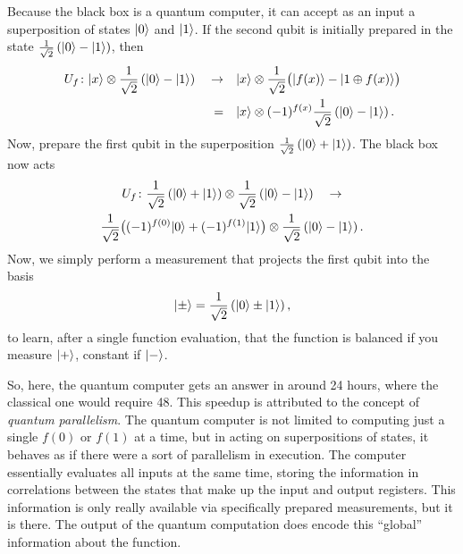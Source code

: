 Because the black box is a quantum computer, it can accept
as an input a superposition of states ${|{0}\rangle}$ and ${|{1}\rangle}$.
If the second qubit is initially prepared in the state
$\frac{1}{\sqrt{2}}\left( {|{0}\rangle} - {|{1}\rangle} \right)$, then
\begin{equation}
\begin{split}
U_f\colon {|{x}\rangle}\otimes\frac{1}{\sqrt{2}}\left( {|{0}\rangle} - {|{1}\rangle} \right)
\quad\to&\quad{|{x}\rangle}\otimes\frac{1}{\sqrt{2}}\bigl({|{f(x)}\rangle} - {|{1\oplus f(x)}\rangle}\bigr)\\
=&\quad{|{x}\rangle}\otimes(-1)^{f(x)}\frac{1}{\sqrt{2}}\left( {|{0}\rangle} - {|{1}\rangle} \right).
\end{split}
\end{equation}
Now, prepare the first qubit in the superposition 
$\frac{1}{\sqrt{2}}\left( {|{0}\rangle} + {|{1}\rangle} \right)$.
The black box now acts
\begin{multline}
U_f\colon \frac{1}{\sqrt{2}}\left( {|{0}\rangle} + {|{1}\rangle} \right)
        \otimes\frac{1}{\sqrt{2}}\left( {|{0}\rangle} - {|{1}\rangle} \right) \quad\to\\
        \frac{1}{\sqrt{2}}\bigl( (-1)^{f(0)}{|{0}\rangle} + (-1)^{f(1)}{|{1}\rangle} \bigr)
        \otimes\frac{1}{\sqrt{2}}\left( {|{0}\rangle} - {|{1}\rangle} \right).
\end{multline}
Now, we simply perform a measurement that projects the first qubit into
the basis
\begin{equation}
{|{\pm}\rangle} = \frac{1}{\sqrt{2}}\left( {|{0}\rangle} \pm {|{1}\rangle} \right),
\end{equation}
to learn, after a single function evaluation, that the function is
balanced if you measure ${|{+}\rangle}$, constant if ${|{-}\rangle}$.

So, here, the quantum computer gets an answer in around 24 hours, where
the classical one would require 48.  This speedup is attributed to
the concept of \emph{quantum parallelism}.  The quantum computer is not
limited to computing just a single $f(0)$ or $f(1)$ at a time, but in acting on
superpositions of states, it behaves as if there were a sort of 
parallelism in execution.  The computer essentially evaluates all inputs
at the same time, storing the information in correlations between the states
that make up the input and output registers.  This information
is only really available via specifically prepared measurements, but it is
there.  The output of the quantum computation does encode this ``global''
information about the function.

